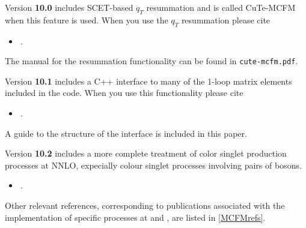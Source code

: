 Version \textbf{10.0} includes SCET-based $q_T$ resummation and is called CuTe-MCFM when this
feature is used. When you use the $q_T$ resummation please cite
\begin{itemize}
	\item {}\,.
\end{itemize}
The manual for the resummation functionality can be found in \texttt{cute-mcfm.pdf}.

Version \textbf{10.1} includes a C++ interface to many of the 1-loop matrix elements
included in the code. When you use this functionality please cite
\begin{itemize}
	\item {}\,.
\end{itemize}
A guide to the structure of the interface is included in this paper.

Version \textbf{10.2} includes a more complete treatment of color singlet production
processes at NNLO, expecially colour singlet processes involving pairs of bosons.
\begin{itemize}
	\item {}\,.
\end{itemize}
Other relevant references, corresponding to publications associated with the
implementation of specific processes at \NLO{} and \NNLO{}, are listed
in \cref{MCFMrefs}.
